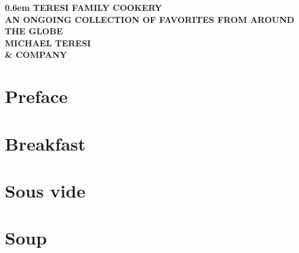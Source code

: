 \frontmatter
\begin{titlepage}
\onecolumn
\pagestyle{empty}
\newcommand\nbvspace[1][3]{\vspace*{\stretch{#1}}}
\newcommand\nbstretchyspace{\spaceskip0.5em plus 0.25em minus 0.25em}
\newcommand{\nbtitlestretch}{\spaceskip0.6em}
{
	\centering
	\bfseries
	\nbvspace[1]
	\Huge
	{\nbtitlestretch
		TERESI FAMILY COOKERY
	}\\
	\nbvspace[1]
	\footnotesize
	AN ONGOING COLLECTION OF FAVORITES FROM AROUND THE GLOBE\\
	\nbvspace[1]
	\Large MICHAEL TERESI \\ \small \& COMPANY\\
	\nbvspace[1]
	\hspace{1em}  %
	\vfill
}
\end{titlepage}

\dominitoc  %
\nomtcrule  %

\tableofcontents


\chapter*{Preface}
\enlargethispage{5\baselineskip}  %


\clearpage

\mainmatter

\setcounter{mtc}{0}  %
\mtcaddchapter       %
\chapter{Breakfast}
\minitoc
\clearpage


\chapter{Sous vide}
\minitoc
\clearpage



\chapter{Soup}
\minitoc
\clearpage






